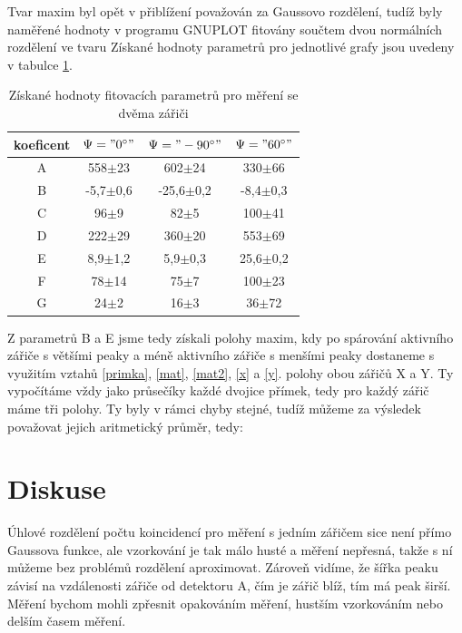\documentclass[10pt,a4paper]{article}
\begin{document}
Tvar maxim byl opět v přiblížení považován za Gaussovo rozdělení, tudíž byly naměřené hodnoty v programu GNUPLOT fitovány součtem dvou normálních rozdělení ve tvaru
Získané hodnoty parametrů pro jednotlivé grafy jsou uvedeny v tabulce \ref{params2}.
\begin{table}[h]
\centering
\caption{Získané hodnoty fitovacích parametrů pro měření se dvěma zářiči}
\label{params2}
\begin{tabular}{|c|c|c|c|}
\hline
koeficent&$\Psi="0 ^\circ"$&$\Psi="-90 ^\circ"$&$\Psi="60 ^\circ"$
\\
\hline
A&558$\pm$23&602$\pm$24&330$\pm$66
\\
\hline
B&-5,7$\pm$0,6&-25,6$\pm$0,2&-8,4$\pm$0,3
\\
\hline
C&96$\pm$9&82$\pm$5&100$\pm$41
\\
\hline
D&222$\pm$29&360$\pm$20&553$\pm$69
\\
\hline
E&8,9$\pm$1,2&5,9$\pm$0,3&25,6$\pm$0,2
\\
\hline
F&78$\pm$14&75$\pm$7&100$\pm$23
\\
\hline
G&24$\pm$2&16$\pm$3&36$\pm$72
\\
\hline
\end{tabular}
\end{table}
Z parametrů B a E jsme tedy získali polohy maxim, kdy po spárování aktivního zářiče s většími peaky a méně aktivního zářiče s menšími peaky dostaneme s využitím vztahů \eqref{primka}, \eqref{mat},  \eqref{mat2},  \eqref{x} a  \eqref{y}.
polohy obou zářičů X a Y. Ty vypočítáme vždy jako průsečíky každé dvojice přímek, tedy pro každý zářič máme tři polohy. Ty byly v rámci chyby stejné, tudíž můžeme za výsledek považovat jejich aritmetický průměr, tedy:
\section*{Diskuse}
Úhlové rozdělení počtu koincidencí pro měření s jedním zářičem sice není přímo Gaussova funkce, ale vzorkování je tak málo husté a měření nepřesná, takže s ní můžeme bez problémů rozdělení aproximovat. Zároveň vidíme, že šířka peaku závisí na vzdálenosti zářiče od detektoru A, čím je zářič blíž, tím má peak širší. Měření bychom mohli zpřesnit opakováním měření, hustším vzorkováním nebo delším časem měření.
\end{document}
